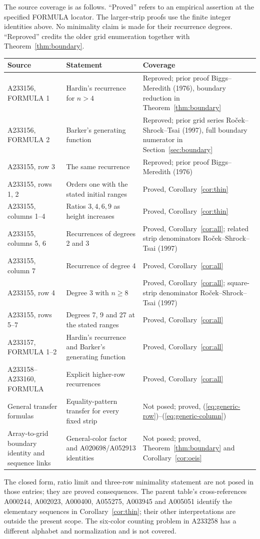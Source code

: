 \documentclass[11pt,a4paper]{article}
\begin{document}
\noindent The source coverage is as follows. ``Proved'' refers to an
empirical assertion at the specified FORMULA locator. The larger-strip
proofs use the finite integer identities above. No minimality claim is
made for their recurrence degrees. ``Reproved'' credits the older grid
enumeration together with Theorem~\ref{thm:boundary}.
\begin{center}
\small
\begin{tabularx}{\textwidth}{@{}p{}XX@{}}
\toprule
Source & Statement & Coverage\\\midrule
A233156, FORMULA 1 & Hardin's recurrence for \(n>4\) & Reproved; prior proof Biggs--Meredith (1976), boundary reduction in Theorem~\ref{thm:boundary}\\
A233156, FORMULA 2 & Barker's generating function & Reproved; prior grid series Ro\v{c}ek--Shrock--Tsai (1997), full boundary numerator in Section~\ref{sec:boundary}\\
A233155, row 3 & The same recurrence & Reproved; prior proof Biggs--Meredith (1976)\\
A233155, rows 1, 2 & Orders one with the stated initial ranges & Proved, Corollary~\ref{cor:thin}\\
A233155, columns 1--4 & Ratios \(3,4,6,9\) as height increases & Proved, Corollary~\ref{cor:thin}\\
A233155, columns 5, 6 & Recurrences of degrees 2 and 3 & Proved, Corollary~\ref{cor:all}; related strip denominators Ro\v{c}ek--Shrock--Tsai (1997)\\
A233155, column 7 & Recurrence of degree 4 & Proved, Corollary~\ref{cor:all}\\
A233155, row 4 & Degree 3 with \(n\ge8\) & Proved, Corollary~\ref{cor:all}; square-strip denominator Ro\v{c}ek--Shrock--Tsai (1997)\\
A233155, rows 5--7 & Degrees 7, 9 and 27 at the stated ranges & Proved, Corollary~\ref{cor:all}\\
A233157, FORMULA 1--2 & Hardin's recurrence and Barker's generating function & Proved, Corollary~\ref{cor:all}\\
A233158--A233160, FORMULA & Explicit higher-row recurrences & Proved, Corollary~\ref{cor:all}\\
General transfer formulas & Equality-pattern transfer for every fixed strip & Not posed; proved, (\ref{eq:generic-row})--(\ref{eq:generic-column})\\
Array-to-grid boundary identity and sequence links & General-color factor and A020698/A052913 identities & Not posed; proved, Theorem~\ref{thm:boundary} and Corollary~\ref{cor:oeis}\\
\bottomrule
\end{tabularx}
\end{center}
The closed form, ratio limit and three-row minimality statement are
not posed in those entries; they are proved consequences. The parent
table's cross-references A000244, A002023, A000400, A055275, A003945
and A005051 identify the elementary sequences in Corollary~\ref{cor:thin};
their other interpretations are outside the present scope. The six-color counting problem
in A233258 has a different alphabet and normalization and is not covered.
\end{document}

